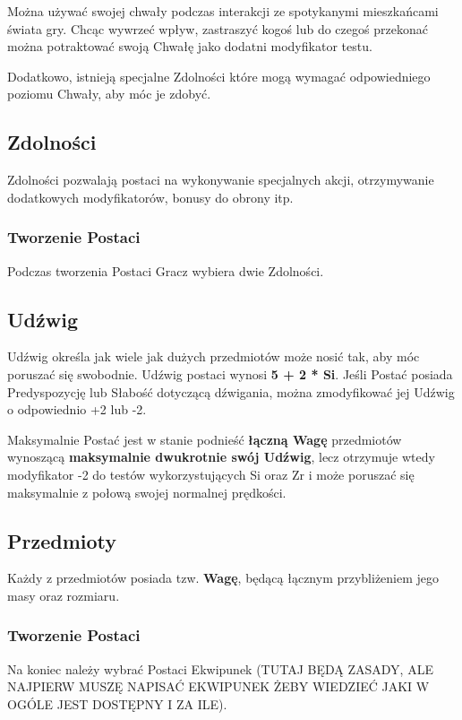 \documentclass[10pt,a4paper]{book}
\begin{document}
\begin{multicols}{2}
Można używać swojej chwały podczas interakcji ze spotykanymi mieszkańcami świata gry. Chcąc wywrzeć wpływ, zastraszyć kogoś lub do czegoś przekonać można potraktować swoją Chwałę jako dodatni modyfikator testu.

Dodatkowo, istnieją specjalne Zdolności które mogą wymagać odpowiedniego poziomu Chwały, aby móc je zdobyć.


\subsection*{Zdolności}
Zdolności pozwalają postaci na wykonywanie specjalnych akcji, otrzymywanie dodatkowych modyfikatorów, bonusy do obrony itp.

\subsubsection*{Tworzenie Postaci}
Podczas tworzenia Postaci Gracz wybiera dwie Zdolności.


\subsection*{Udźwig}
Udźwig określa jak wiele jak dużych przedmiotów może nosić tak, aby móc poruszać się swobodnie. Udźwig postaci wynosi \textbf{5 + 2 * Si}. Jeśli Postać posiada Predyspozycję lub Słabość dotyczącą dźwigania, można zmodyfikować jej Udźwig o odpowiednio +2 lub -2.

Maksymalnie Postać jest w stanie podnieść \textbf{łączną Wagę} przedmiotów wynoszącą \textbf{maksymalnie dwukrotnie swój Udźwig}, lecz otrzymuje wtedy modyfikator -2 do testów wykorzystujących Si oraz Zr i może poruszać się maksymalnie z połową swojej normalnej prędkości.


\subsection*{Przedmioty}
Każdy z przedmiotów posiada tzw. \textbf{Wagę}, będącą łącznym przybliżeniem jego masy oraz rozmiaru.

\subsubsection*{Tworzenie Postaci}
Na koniec należy wybrać Postaci Ekwipunek (TUTAJ BĘDĄ ZASADY, ALE NAJPIERW MUSZĘ NAPISAĆ EKWIPUNEK ŻEBY WIEDZIEĆ JAKI W OGÓLE JEST DOSTĘPNY I ZA ILE).

\end{multicols}
\end{document}
